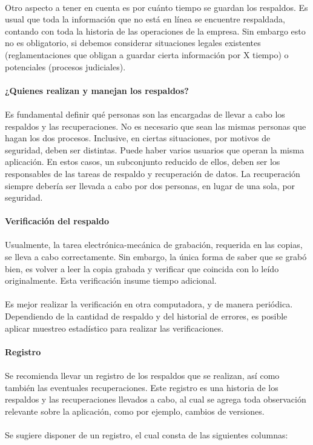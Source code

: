\begin{enumerate}[3.1.]
\\Otro aspecto a tener en cuenta es por cuánto tiempo se guardan los respaldos. Es usual que toda la información que no está en línea se encuentre respaldada, contando con toda la historia de las operaciones de la empresa. Sin embargo esto no es obligatorio, si debemos considerar situaciones legales existentes (reglamentaciones que obligan a guardar cierta información por X tiempo) o potenciales (procesos judiciales). 
\\
\\
\textbf{¿Quienes realizan y manejan los respaldos?}
\\
\\Es fundamental definir qué personas son las encargadas de llevar a cabo los respaldos y las recuperaciones. No es necesario que sean las mismas personas que hagan los dos procesos. Inclusive, en ciertas situaciones, por motivos de seguridad, deben ser distintas. Puede haber varios usuarios que operan la misma aplicación. En estos casos, un subconjunto reducido de ellos, deben ser los responsables de las tareas de respaldo y recuperación de datos. La recuperación siempre debería ser llevada a cabo por dos personas, en lugar de una sola, por seguridad.
\\
\\
\textbf{Verificación del respaldo }
\\
\\Usualmente, la tarea electrónica-mecánica de grabación, requerida en las copias, se lleva a cabo correctamente. Sin embargo, la única forma de saber que se grabó bien, es volver a leer la copia grabada y verificar que coincida con lo leído originalmente. Esta verificación insume tiempo adicional. 
\\
\\Es mejor realizar la verificación en otra computadora, y de manera periódica. Dependiendo de la cantidad de respaldo y del historial de errores, es posible aplicar muestreo estadístico para realizar las verificaciones. 
\\
\\
\textbf{Registro}
\\
\\Se recomienda llevar un registro de los respaldos que se realizan, así como también las eventuales recuperaciones. Este registro es una historia de los respaldos y las recuperaciones llevados a cabo, al cual se agrega toda observación relevante sobre la aplicación, como por ejemplo, cambios de versiones. 
\\
\\Se sugiere disponer de un registro, el cual consta de las siguientes columnas: 

\end{enumerate}
